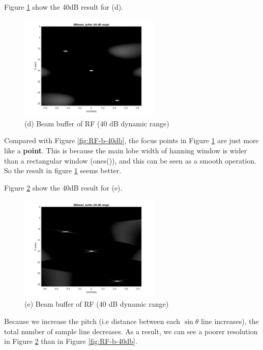 \documentclass{article}
\begin{document}
Figure \ref{fig:RF-hanning-40db} show the 40dB result for (d).
\begin{figure}[H]
    \centering
    \includegraphics[width=0.6\textwidth]{src/RF/b-8-hanning.pdf}
    \caption{(d) Beam buffer of RF (40 dB dynamic range)}
    \label{fig:RF-hanning-40db}
\end{figure}
Compared with Figure \ref{fig:RF-b-40db}, the focus points in Figure \ref{fig:RF-hanning-40db} are just more like a \textbf{point}.
This is because the main lobe width of hanning window is wider than a rectangular window (ones()), and this can be seen as a smooth
operation. So the result in figure \ref{fig:RF-hanning-40db} seems better.

Figure \ref{fig:RF-2pitch-40db} show the 40dB result for (e).
\begin{figure}[H]
    \centering
    \includegraphics[width=0.6\textwidth]{src/RF/b-8-2pitch.pdf}
    \caption{(e) Beam buffer of RF (40 dB dynamic range)}
    \label{fig:RF-2pitch-40db}
\end{figure}
Because we increase the pitch (i.e distance between each $\sin \theta$ line increases), the total number of sample line decreases.
As a result, we can see a poorer resolution in Figure \ref{fig:RF-2pitch-40db} than in Figure \ref{fig:RF-b-40db}.
\end{document}
